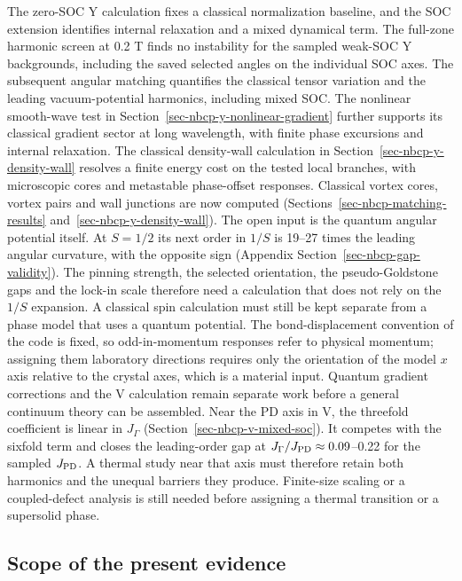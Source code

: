 The zero-SOC Y calculation fixes a classical normalization baseline, and
the SOC extension identifies internal relaxation and a mixed dynamical
term. The full-zone harmonic screen at 0.2 T finds no instability for
the sampled weak-SOC Y backgrounds, including the saved selected angles
on the individual SOC axes. The subsequent angular matching quantifies
the classical tensor variation and the leading vacuum-potential
harmonics, including mixed SOC. The nonlinear smooth-wave test in
Section~\ref{sec-nbcp-y-nonlinear-gradient} further supports its
classical gradient sector at long wavelength, with finite phase
excursions and internal relaxation. The classical density-wall
calculation in Section~\ref{sec-nbcp-y-density-wall} resolves a finite
energy cost on the tested local branches, with microscopic cores and
metastable phase-offset responses. Classical vortex cores, vortex pairs
and wall junctions are now computed
(Sections~\ref{sec-nbcp-matching-results}
and~\ref{sec-nbcp-y-density-wall}). The open input is the quantum
angular potential itself. At \(S=1/2\) its next order in \(1/S\) is
19--27 times the leading angular curvature, with the opposite sign
(Appendix Section~\ref{sec-nbcp-gap-validity}). The pinning strength,
the selected orientation, the pseudo-Goldstone gaps and the lock-in
scale therefore need a calculation that does not rely on the \(1/S\)
expansion. A classical spin calculation must still be kept separate
from a phase model that uses a quantum potential. The bond-displacement convention of the code is fixed, so
odd-in-momentum responses refer to physical momentum; assigning them
laboratory directions requires only the orientation of the model \(x\)
axis relative to the crystal axes, which is a material input.
Quantum gradient corrections and the V calculation remain separate work
before a general continuum theory can be assembled. Near the PD axis in
V, the threefold coefficient is linear in \(J_\Gamma\)
(Section~\ref{sec-nbcp-v-mixed-soc}). It competes with the sixfold term
and closes the leading-order gap at \(J_\Gamma/J_{\rm PD}\approx0.09\)--0.22
for the sampled \(J_{\rm PD}\). A thermal study near that axis must
therefore retain both harmonics and the unequal barriers they produce.
Finite-size scaling or a coupled-defect analysis is still needed before
assigning a thermal transition or a supersolid phase.

\subsection{Scope of the present
evidence}\label{scope-of-the-present-evidence}

